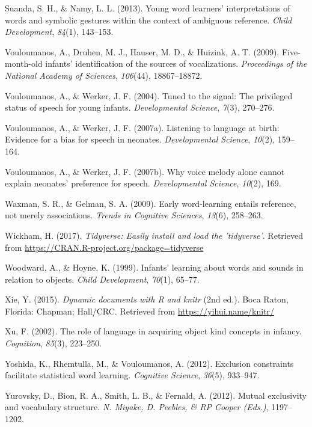 \documentclass[english,floatsintext,man]{apa6}
\theoremstyle{definition}
\theoremstyle{definition}
\theoremstyle{definition}
\theoremstyle{remark}
\begin{document}
\leavevmode\hypertarget{ref-suanda2013young}{}%
Suanda, S. H., \& Namy, L. L. (2013). Young word learners'
interpretations of words and symbolic gestures within the context of
ambiguous reference. \emph{Child Development}, \emph{84}(1), 143--153.

\leavevmode\hypertarget{ref-vouloumanos2009five}{}%
Vouloumanos, A., Druhen, M. J., Hauser, M. D., \& Huizink, A. T. (2009).
Five-month-old infants' identification of the sources of vocalizations.
\emph{Proceedings of the National Academy of Sciences}, \emph{106}(44),
18867--18872.

\leavevmode\hypertarget{ref-vouloumanos2004tuned}{}%
Vouloumanos, A., \& Werker, J. F. (2004). Tuned to the signal: The
privileged status of speech for young infants. \emph{Developmental
Science}, \emph{7}(3), 270--276.

\leavevmode\hypertarget{ref-vouloumanos2007listening}{}%
Vouloumanos, A., \& Werker, J. F. (2007a). Listening to language at
birth: Evidence for a bias for speech in neonates. \emph{Developmental
Science}, \emph{10}(2), 159--164.

\leavevmode\hypertarget{ref-vouloumanos2007voice}{}%
Vouloumanos, A., \& Werker, J. F. (2007b). Why voice melody alone cannot
explain neonates' preference for speech. \emph{Developmental Science},
\emph{10}(2), 169.

\leavevmode\hypertarget{ref-waxman2009early}{}%
Waxman, S. R., \& Gelman, S. A. (2009). Early word-learning entails
reference, not merely associations. \emph{Trends in Cognitive Sciences},
\emph{13}(6), 258--263.

\leavevmode\hypertarget{ref-R-tidyverse}{}%
Wickham, H. (2017). \emph{Tidyverse: Easily install and load the
'tidyverse'}. Retrieved from
\url{https://CRAN.R-project.org/package=tidyverse}

\leavevmode\hypertarget{ref-woodward1999infants}{}%
Woodward, A., \& Hoyne, K. (1999). Infants' learning about words and
sounds in relation to objects. \emph{Child Development}, \emph{70}(1),
65--77.

\leavevmode\hypertarget{ref-R-knitr}{}%
Xie, Y. (2015). \emph{Dynamic documents with R and knitr} (2nd ed.).
Boca Raton, Florida: Chapman; Hall/CRC. Retrieved from
\url{https://yihui.name/knitr/}

\leavevmode\hypertarget{ref-xu2002role}{}%
Xu, F. (2002). The role of language in acquiring object kind concepts in
infancy. \emph{Cognition}, \emph{85}(3), 223--250.

\leavevmode\hypertarget{ref-yoshida2012exclusion}{}%
Yoshida, K., Rhemtulla, M., \& Vouloumanos, A. (2012). Exclusion
constraints facilitate statistical word learning. \emph{Cognitive
Science}, \emph{36}(5), 933--947.

\leavevmode\hypertarget{ref-yurovsky2012mutual}{}%
Yurovsky, D., Bion, R. A., Smith, L. B., \& Fernald, A. (2012). Mutual
exclusivity and vocabulary structure. \emph{N. Miyake, D. Peebles, \& RP
Cooper (Eds.)}, 1197--1202.



\clearpage
\renewcommand{\listfigurename}{Figure captions}
\listoffigures
\end{document}
